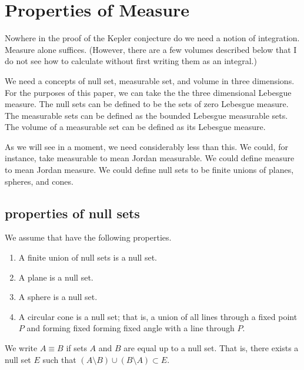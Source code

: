 
\section{Properties of Measure}

Nowhere in the proof of the Kepler conjecture do we need a notion
of integration.  Measure alone suffices.  (However, there are a few
volumes described below that I do not see how to calculate without
first writing them as an integral.)

We need a concepts of null set, measurable set, and volume in
three dimensions.  For the purposes of this paper, we can take the
the three dimensional Lebesgue measure.   
The null sets can be defined
to be the sets of zero Lebesgue measure. The measurable sets can
be defined as the bounded Lebesgue measurable sets.  The volume of
a measurable set can be defined as its Lebesgue measure.

As we will see in a moment, we need considerably less than this.
We could, for instance,
take measurable to mean Jordan measurable.   We could define
measure to mean Jordan measure.  We could define null sets to be
finite unions of planes, spheres, and cones.



\subsection{properties of null sets}

We assume that have the following
properties.

\begin{enumerate}%
\label{enum:null}
\item A finite union of null sets is a null set.\\
 \item A plane is a null set.\\
 \item A sphere is a null set.\\
 \item A circular cone is a null set; that is, a union of all
  lines through a fixed point $P$ and forming fixed
 forming fixed angle with a line through $P$.
\end{enumerate}

We write $A\equiv B$ if sets $A$ and $B$ are equal up to a null set.
That is, there exists a null set $E$ such that
   $(A\setminus B) \cup (B\setminus A) \subset E$.

